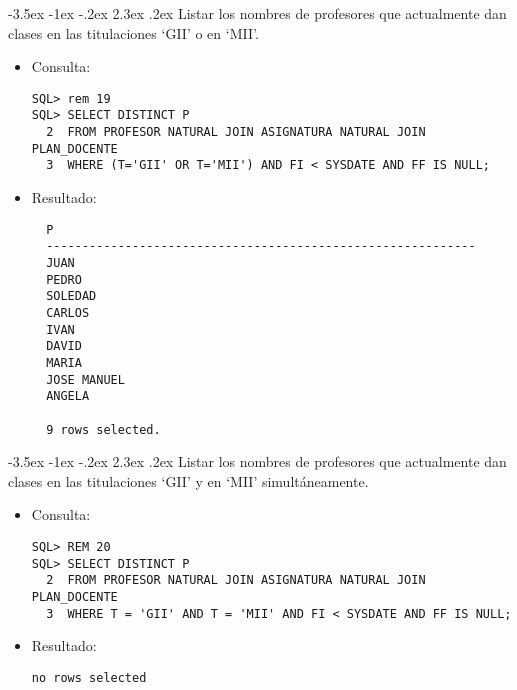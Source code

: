\documentclass[11pt]{report}
\makeatletter
\renewcommand\chapter{\@startsection{chapter}{0}{\z@}%
    {-3.5ex \@plus -1ex \@minus -.2ex}%
    {2.3ex \@plus.2ex}%
    {\normalfont\Large\bfseries}}
\makeatother
\begin{document}
\chapter{Listar los nombres de profesores que actualmente dan clases en las titulaciones ‘GII’ o en ‘MII’.}
\begin{itemize}
  \item Consulta:
  \begin{verbatim}
SQL> rem 19
SQL> SELECT DISTINCT P
  2  FROM PROFESOR NATURAL JOIN ASIGNATURA NATURAL JOIN PLAN_DOCENTE
  3  WHERE (T='GII' OR T='MII') AND FI < SYSDATE AND FF IS NULL;
  \end{verbatim}
  \item{Resultado:}
  \begin{verbatim}
  P                                                                               
  ------------------------------------------------------------                    
  JUAN                                                                            
  PEDRO                                                                           
  SOLEDAD                                                                         
  CARLOS                                                                          
  IVAN                                                                            
  DAVID                                                                           
  MARIA                                                                           
  JOSE MANUEL                                                                     
  ANGELA                                                                          
  
  9 rows selected.                                                                   
  \end{verbatim}
\end{itemize}

\chapter{Listar los nombres de profesores que actualmente dan clases en las titulaciones ‘GII’ y en ‘MII’ simultáneamente.}
\begin{itemize}
  \item Consulta:
  \begin{verbatim}
SQL> REM 20
SQL> SELECT DISTINCT P
  2  FROM PROFESOR NATURAL JOIN ASIGNATURA NATURAL JOIN PLAN_DOCENTE
  3  WHERE T = 'GII' AND T = 'MII' AND FI < SYSDATE AND FF IS NULL;
  \end{verbatim}
  \item{Resultado:}
  \begin{verbatim}
no rows selected
  \end{verbatim}
\end{itemize}
\end{document}
